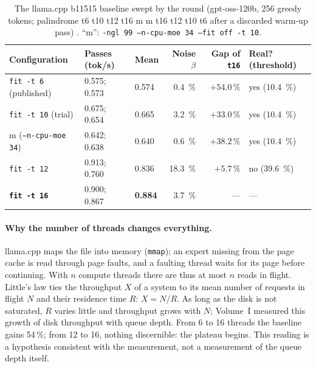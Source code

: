 \begin{table}[ht]
\centering\small
\caption[The swept llama.cpp baseline]{The llama.cpp b11515 baseline swept by the round (gpt-oss-120b, 256 greedy tokens; palindrome t6 t10 t12 t16 m m t16 t12 t10 t6 after a discarded warm-up pass) \mes. ``m'': \texttt{-ngl 99 --n-cpu-moe 34 --fit off -t 10}.}
\label{t2res-tab:base}
\begin{tabular}{@{}lllrrl@{}}
\toprule
Configuration & Passes (tok/s) & Mean & Noise $\beta$ & Gap of \texttt{t16} & Real? (threshold) \\
\midrule
\texttt{fit -t 6} (published) & \num{0.575}; \num{0.573} & \num{0.574} & \SI{0.4}{\percent} & $+54.0\,\%$ & yes (\SI{10.4}{\percent}) \\
\texttt{fit -t 10} (trial) & \num{0.675}; \num{0.654} & \num{0.665} & \SI{3.2}{\percent} & $+33.0\,\%$ & yes (\SI{10.4}{\percent}) \\
m (\texttt{--n-cpu-moe 34}) & \num{0.642}; \num{0.638} & \num{0.640} & \SI{0.6}{\percent} & $+38.2\,\%$ & yes (\SI{10.4}{\percent}) \\
\texttt{fit -t 12} & \num{0.913}; \num{0.760} & \num{0.836} & \SI{18.3}{\percent} & $+5.7\,\%$ & no (\SI{39.6}{\percent}) \\
\textbf{\mbox{\texttt{fit -t 16}}} & \num{0.900}; \num{0.867} & \textbf{\num{0.884}} & \SI{3.7}{\percent} & --- & --- \\
\bottomrule
\end{tabular}
\end{table}

\paragraph{Why the number of threads changes everything.} llama.cpp maps the file into memory (\texttt{mmap}); an expert missing from the page cache is read through page faults, and a faulting thread waits for its page before continuing. With $n$ compute threads there are thus at most $n$ reads in flight. Little's law \cite{little1961} ties the throughput $X$ of a system to its mean number of requests in flight $N$ and their residence time $R$: $X = N/R$. As long as the disk is not saturated, $R$ varies little and throughput grows with $N$; Volume~I measured this growth of disk throughput with queue depth. From 6 to 16 threads the baseline gains \num{54}\,\%; from 12 to 16, nothing discernible: the plateau begins. This reading is a hypothesis consistent with the measurement, not a measurement of the queue depth itself.

